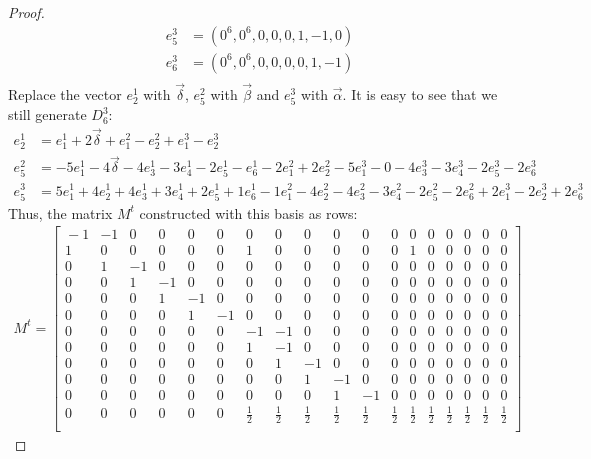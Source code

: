 \documentclass{article}
\newcommand{\de}{\delta}
\theoremstyle{plain}
\theoremstyle{definition}
\begin{document}
\begin{proof}
\begin{align}
            e^3_5&=(0^6, 0^6, 0, 0, 0, 1, -1, 0)     \nonumber \\
            e^3_6&=(0^6, 0^6, 0, 0, 0, 0, 1, -1)     \nonumber \\
        \end{align}
        Replace the vector $e^1_2$ with ${\vec{\de}}$, $e^2_5$ with $\vec{\beta}$ and $e^3_5$ with $\vec{\alpha}$.
        It is easy to see that we still generate $D_6^3$:
        \begin{align}
            e^1_2&=e^1_1 + 2{\vec{\de}} + e^2_1 - e^2_2 + e^3_1 - e^3_2 \\
            e^2_5&=-5e^1_1 - 4{\vec{\de}} - 4e^1_3 - 3e^1_4 - 2e^1_5 - e^1_6 - 2e^2_1 + 2e^2_2 - 5e^3_1 - 0 - 4e^3_3 - 3e^3_4 - 2e^3_5 - 2e^3_6 \\
            e^3_5&=5e^1_1 + 4e^1_2 + 4e^1_3 + 3e^1_4 + 2e^1_5 + 1e^1_6 - 1e^2_1 - 4e^2_2 - 4e^2_3 - 3e^2_4 - 2e^2_5 - 2e^2_6 + 2e^3_1 - 2e^3_2 + 2e^3_6
        \end{align}
        Thus, the matrix $M^t$ constructed with this basis as rows:
        \begin{align}
    M^t = 
    \begin{bmatrix}{}
        -1 & -1 & 0 & 0 & 0 & 0 & 0 & 0 & 0 & 0 & 0 & 0 & 0 & 0 & 0 & 0 & 0 & 0 \\
    1 & 0 & 0 & 0 & 0 & 0 & 1 & 0 & 0 & 0 & 0 & 0 & 1 & 0 & 0 & 0 & 0 & 0 \\
    0 & 1 & -1 & 0 & 0 & 0 & 0 & 0 & 0 & 0 & 0 & 0 & 0 & 0 & 0 & 0 & 0 & 0 \\
    0 & 0 & 1 & -1 & 0 & 0 & 0 & 0 & 0 & 0 & 0 & 0 & 0 & 0 & 0 & 0 & 0 & 0 \\
    0 & 0 & 0 & 1 & -1 & 0 & 0 & 0 & 0 & 0 & 0 & 0 & 0 & 0 & 0 & 0 & 0 & 0 \\
    0 & 0 & 0 & 0 & 1 & -1 & 0 & 0 & 0 & 0 & 0 & 0 & 0 & 0 & 0 & 0 & 0 & 0 \\
    0 & 0 & 0 & 0 & 0 & 0 & -1 & -1 & 0 & 0 & 0 & 0 & 0 & 0 & 0 & 0 & 0 & 0 \\
    0 & 0 & 0 & 0 & 0 & 0 & 1 & -1 & 0 & 0 & 0 & 0 & 0 & 0 & 0 & 0 & 0 & 0 \\
    0 & 0 & 0 & 0 & 0 & 0 & 0 & 1 & -1 & 0 & 0 & 0 & 0 & 0 & 0 & 0 & 0 & 0 \\
    0 & 0 & 0 & 0 & 0 & 0 & 0 & 0 & 1 & -1 & 0 & 0 & 0 & 0 & 0 & 0 & 0 & 0 \\
    0 & 0 & 0 & 0 & 0 & 0 & 0 & 0 & 0 & 1 & -1 & 0 & 0 & 0 & 0 & 0 & 0 & 0 \\
    0 & 0 & 0 & 0 & 0 & 0 & \frac{1}{2} & \frac{1}{2} & \frac{1}{2} & \frac{1}{2} & \frac{1}{2} & \frac{1}{2} & \frac{1}{2} & \frac{1}{2} & \frac{1}{2} & \frac{1}{2} & \frac{1}{2} & \frac{1}{2} \\

\end{bmatrix}
\end{align}
\end{proof}
\end{document}
